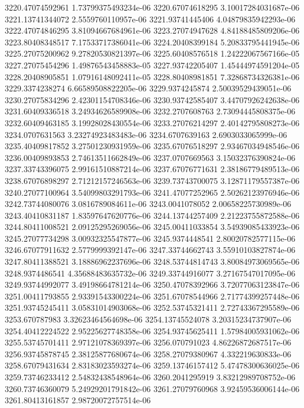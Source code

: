 {3220.47074592961 1.73799375493234e-06
3220.67074618295 3.10017284031687e-06
3221.13741344072 2.5559760110957e-06
3221.93741445406 4.04879835942293e-06
3222.47074846295 3.81094667684961e-06
3223.27074947628 4.84188485809206e-06
3223.80408348517 7.17533717386041e-06
3224.20408399184 5.20833795441945e-06
3225.27075200962 9.27820530821397e-06
3225.60408576518 1.24222067567166e-05
3227.27075454296 1.49876543458883e-05
3227.93742205407 1.45444974591204e-05
3228.20408905851 1.07916148092411e-05
3228.80408981851 7.32868734326381e-06
3229.3374238274 6.66589508822205e-06
3229.9374245874 2.50039529439051e-06
3230.27075834296 2.42301154708346e-06
3230.93742585407 3.44707926242638e-06
3231.60409336518 3.24934626589908e-06
3232.2707608763 2.73094445808375e-06
3232.60409463185 3.19928028430554e-06
3233.27076214297 2.40142795808273e-06
3234.0707631563 3.23274923483483e-06
3234.6707639163 2.6903033065999e-06
3235.40409817852 3.27501230931959e-06
3235.67076518297 2.93467034948546e-06
3236.00409893853 2.74613511662849e-06
3237.0707669563 3.15032376390824e-06
3237.33743396075 2.99161510887214e-06
3237.67076771631 2.38186779489513e-06
3238.67076898297 2.71212157246563e-06
3239.73743700075 3.12871179557387e-06
3240.27077100964 3.54099803291793e-06
3241.47077252965 2.50262123976946e-06
3242.73744080076 3.0816789084611e-06
3243.0041078052 2.00658225730989e-06
3243.40410831187 1.83597647620776e-06
3244.13744257409 2.21223755872588e-06
3244.80411008521 2.09125295269056e-06
3245.00411033854 3.54939085433923e-06
3245.27077734298 3.00932325547877e-06
3245.9374448541 2.80020782577115e-06
3246.67077911632 2.5779999392147e-06
3247.33744662743 3.55910103827874e-06
3247.80411388521 3.18886962237696e-06
3248.53744814743 3.80084973069565e-06
3248.9374486541 4.35688483635732e-06
3249.33744916077 3.27167547017095e-06
3249.93744992077 3.49198664781214e-06
3250.47078392966 3.72077063123847e-06
3251.00411793855 2.93391543300224e-06
3251.67078544966 2.71774399257448e-06
3251.93745245411 3.05831014903068e-06
3252.53745321411 2.72743367295589e-06
3253.670787983 3.32623464564698e-06
3254.13745524078 3.20315234737907e-06
3254.40412224522 2.95225627748358e-06
3254.93745625411 1.57984005931062e-06
3255.53745701411 2.97121078369397e-06
3256.070791023 4.86226872687517e-06
3256.93745878745 2.38125877680674e-06
3258.27079380967 4.332219630833e-06
3258.67079431634 2.83183023593274e-06
3259.13746157412 5.47478300636025e-06
3259.73746233412 2.54832438548964e-06
3260.2041295919 3.83212989708752e-06
3260.73746360079 5.24929201791842e-06
3261.27079760968 3.92459536006144e-06
3261.80413161857 2.98720072757514e-06
}
